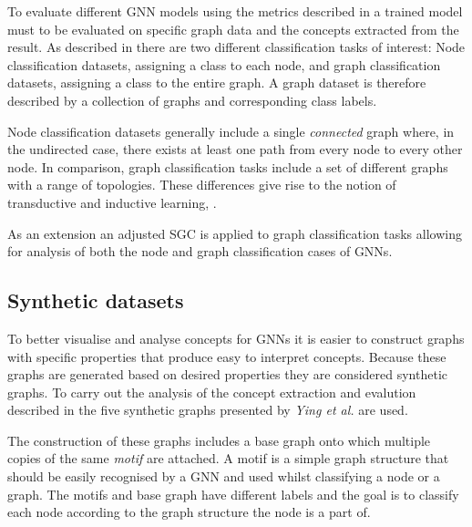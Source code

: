
To evaluate different GNN models using the metrics described in  a trained model must to be evaluated on specific graph data and the concepts extracted from the result.
As described in  there are two different classification tasks of interest:
Node classification datasets, assigning a class to each node, and graph classification datasets, assigning a class to the entire graph.
A graph dataset is therefore described by a collection of graphs and corresponding class labels.

Node classification datasets generally include a single \emph{connected} graph where, in the undirected case, there exists at least one path from every node to every other node.
In comparison, graph classification tasks include a set of different graphs with a range of topologies.
These differences give rise to the notion of transductive and inductive learning, .

As an extension an adjusted SGC is applied to graph classification tasks allowing for analysis of both the node and graph classification cases of GNNs.

\subsection{Synthetic datasets}
\label{sec:synth}


To better visualise and analyse concepts for GNNs it is easier to construct graphs with specific properties that produce easy to interpret concepts.
Because these graphs are generated based on desired properties they are considered synthetic graphs.
To carry out the analysis of the concept extraction and evalution described in  the five synthetic graphs presented by \textit{Ying et al.}\cite{ying2019gnnexplainer} are used.

The construction of these graphs includes a base graph onto which multiple copies of the same \emph{motif} are attached.
A motif is a simple graph structure that should be easily recognised by a GNN and used whilst classifying a node or a graph.
The motifs and base graph have different labels and the goal is to classify each node according to the graph structure the node is a part of.

